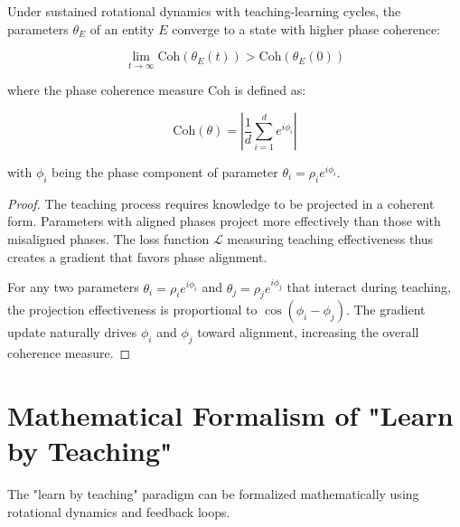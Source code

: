 \begin{theorem}
Under sustained rotational dynamics with teaching-learning cycles, the parameters $\theta_E$ of an entity $E$ converge to a state with higher phase coherence:

\begin{equation}
\lim_{t \rightarrow \infty} \text{Coh}(\theta_E(t)) > \text{Coh}(\theta_E(0))
\end{equation}

where the phase coherence measure $\text{Coh}$ is defined as:

\begin{equation}
\text{Coh}(\theta) = \left|\frac{1}{d}\sum_{i=1}^d e^{i\phi_i}\right|
\end{equation}

with $\phi_i$ being the phase component of parameter $\theta_i = \rho_i e^{i\phi_i}$.
\end{theorem}

\begin{proof}
The teaching process requires knowledge to be projected in a coherent form. Parameters with aligned phases project more effectively than those with misaligned phases. The loss function $\mathcal{L}$ measuring teaching effectiveness thus creates a gradient that favors phase alignment.

For any two parameters $\theta_i = \rho_i e^{i\phi_i}$ and $\theta_j = \rho_j e^{i\phi_j}$ that interact during teaching, the projection effectiveness is proportional to $\cos(\phi_i - \phi_j)$. The gradient update naturally drives $\phi_i$ and $\phi_j$ toward alignment, increasing the overall coherence measure.
\end{proof}

\section{Mathematical Formalism of "Learn by Teaching"}

The "learn by teaching" paradigm can be formalized mathematically using rotational dynamics and feedback loops.

